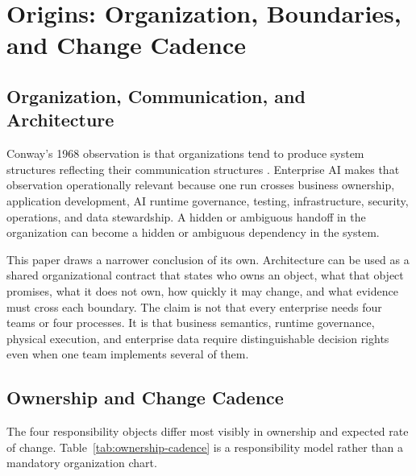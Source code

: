\section{Origins: Organization, Boundaries, and Change Cadence}
\label{sec:origins}

\subsection{Organization, Communication, and Architecture}

Conway's 1968 observation is that organizations tend to produce system structures reflecting their communication structures \cite{conway1968committees}. Enterprise AI makes that observation operationally relevant because one run crosses business ownership, application development, AI runtime governance, testing, infrastructure, security, operations, and data stewardship. A hidden or ambiguous handoff in the organization can become a hidden or ambiguous dependency in the system.

This paper draws a narrower conclusion of its own. Architecture can be used as a shared organizational contract that states who owns an object, what that object promises, what it does not own, how quickly it may change, and what evidence must cross each boundary. The claim is not that every enterprise needs four teams or four processes. It is that business semantics, runtime governance, physical execution, and enterprise data require distinguishable decision rights even when one team implements several of them.

\subsection{Ownership and Change Cadence}

The four responsibility objects differ most visibly in ownership and expected rate of change. Table~\ref{tab:ownership-cadence} is a responsibility model rather than a mandatory organization chart.

